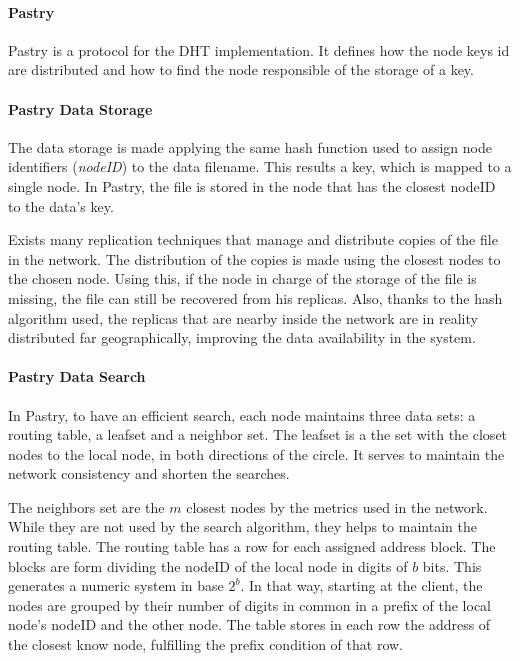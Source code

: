 \paragraph{Pastry}
\label{sec:pastry}
Pastry is a protocol for the DHT implementation. It defines how the node keys id
are distributed and how to find the node responsible of the storage of a key.

\paragraph{Pastry Data Storage}

The data storage is made applying the same hash function used to assign node
identifiers (\textit{nodeID}) to the data filename. This results a key, which is
mapped to a single node. In Pastry, the file is stored in the node that has the closest nodeID
to the data's key.

Exists many replication techniques that manage and distribute copies of the file
in the network. The distribution of the copies is made using the closest nodes
to the chosen node. Using this, if the node in charge of the storage of the file
is missing, the file can still be recovered from his replicas. Also, thanks
to the hash algorithm used, the replicas that are nearby inside the network are
in reality distributed far geographically, improving the data availability
in the system.

\paragraph{Pastry Data Search}

In Pastry, to have an efficient search, each node maintains three data sets:
a routing table, a leafset and a neighbor set.
The leafset is a the set with the closet nodes to the local node, in both
directions of the circle. It serves to maintain the network consistency and
shorten the searches.

The neighbors set are the $m$ closest nodes by the metrics used in the network.
While they are not used by the search algorithm, they helps to maintain the
routing table.
The routing table has a row for each assigned address block. The blocks are
form dividing the nodeID of the local node in digits of $b$ bits. This
generates a numeric system in base $2^b$. In that way, starting at the client,
the nodes are grouped by their number of digits in common in a prefix of the
local node's nodeID and the other node. The table stores in each row the
address of the closest know node, fulfilling the prefix condition of that row.

